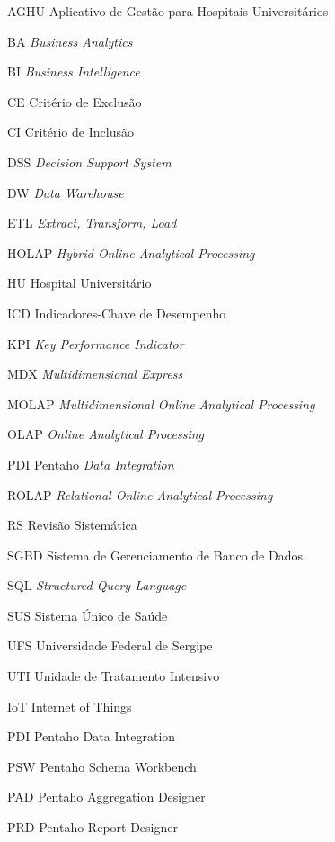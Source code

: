 
\begin{siglas}
\item[AGHU]{Aplicativo de Gestão para Hospitais Universitários}
\item[BA]{\textit{Business Analytics}}
\item[BI]{\textit{Business Intelligence}}
\item[CE]{Critério de Exclusão}
\item[CI]{Critério de Inclusão}
\item[DSS]{\textit{Decision Support System}}
\item[DW]{\textit{Data Warehouse}}
\item[ETL]{\textit{Extract, Transform, Load}}
\item[HOLAP]{\textit{Hybrid Online Analytical Processing}}
\item[HU]{Hospital Universitário}
\item[ICD]{Indicadores-Chave de Desempenho}
\item[KPI]{\textit{Key Performance Indicator}}
\item[MDX]{\textit{Multidimensional Express}}
\item[MOLAP]{\textit{Multidimensional Online Analytical Processing}}
\item[OLAP]{\textit{Online Analytical Processing}}
\item[PDI]{Pentaho \textit{Data Integration}}
\item[ROLAP]{\textit{Relational Online Analytical Processing}}
\item[RS]{Revisão Sistemática}
\item[SGBD]{Sistema de Gerenciamento de Banco de Dados}
\item[SQL]{\textit{Structured Query Language}}
\item[SUS]{Sistema Único de Saúde}
\item[UFS]{Universidade Federal de Sergipe}
\item[UTI]{Unidade de Tratamento Intensivo}
\item[IoT]{Internet of Things}
\item[PDI]{Pentaho Data Integration}
\item[PSW]{Pentaho Schema Workbench}
\item[PAD]{Pentaho Aggregation Designer}
\item[PRD]{Pentaho Report Designer}
\end{siglas}